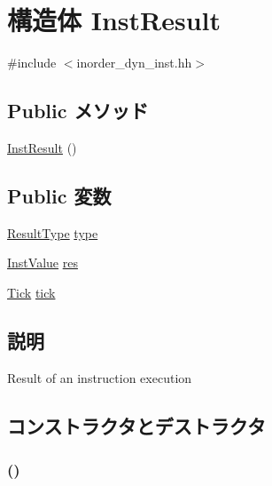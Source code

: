 \hypertarget{structInOrderDynInst_1_1InstResult}{
\section{構造体 InstResult}
\label{structInOrderDynInst_1_1InstResult}
}


{\ttfamily \#include $<$inorder\_\-dyn\_\-inst.hh$>$}\subsection*{Public メソッド}
\begin{DoxyCompactItemize}
\item 
\hyperlink{structInOrderDynInst_1_1InstResult_a838dcf4c31da5f0db33e54585f9a8dd5}{InstResult} ()
\end{DoxyCompactItemize}
\subsection*{Public 変数}
\begin{DoxyCompactItemize}
\item 
\hyperlink{classInOrderDynInst_aa71b5fc2a82d29a91db3a734ff892a49}{ResultType} \hyperlink{structInOrderDynInst_1_1InstResult_a878250d40c82c9e797f5219027794466}{type}
\item 
\hyperlink{structInOrderDynInst_1_1InstValue}{InstValue} \hyperlink{structInOrderDynInst_1_1InstResult_a24d6ff4df7cbbca5b395cf9e2801b555}{res}
\item 
\hyperlink{base_2types_8hh_a5c8ed81b7d238c9083e1037ba6d61643}{Tick} \hyperlink{structInOrderDynInst_1_1InstResult_a4daae57fbf09ee5423d123f5ce330e92}{tick}
\end{DoxyCompactItemize}


\subsection{説明}
Result of an instruction execution 

\subsection{コンストラクタとデストラクタ}
\hypertarget{structInOrderDynInst_1_1InstResult_a838dcf4c31da5f0db33e54585f9a8dd5}{
\subsubsection[{InstResult}]{ ()}}
\label{structInOrderDynInst_1_1InstResult_a838dcf4c31da5f0db33e54585f9a8dd5}



